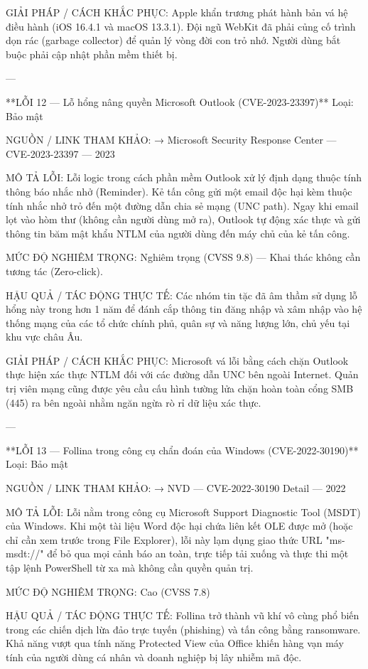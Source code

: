 GIẢI PHÁP / CÁCH KHẮC PHỤC:
Apple khẩn trương phát hành bản vá hệ điều hành (iOS 16.4.1 và macOS 13.3.1). Đội ngũ WebKit đã phải củng cố trình dọn rác (garbage collector) để quản lý vòng đời con trỏ nhớ. Người dùng bắt buộc phải cập nhật phần mềm thiết bị.

---

**LỖI 12 — Lỗ hổng nâng quyền Microsoft Outlook (CVE-2023-23397)**
Loại: Bảo mật

NGUỒN / LINK THAM KHẢO:
→ Microsoft Security Response Center — CVE-2023-23397 — 2023

MÔ TẢ LỖI:
Lỗi logic trong cách phần mềm Outlook xử lý định dạng thuộc tính thông báo nhắc nhở (Reminder). Kẻ tấn công gửi một email độc hại kèm thuộc tính nhắc nhở trỏ đến một đường dẫn chia sẻ mạng (UNC path). Ngay khi email lọt vào hòm thư (không cần người dùng mở ra), Outlook tự động xác thực và gửi thông tin băm mật khẩu NTLM của người dùng đến máy chủ của kẻ tấn công.

MỨC ĐỘ NGHIÊM TRỌNG:
Nghiêm trọng (CVSS 9.8) — Khai thác không cần tương tác (Zero-click).

HẬU QUẢ / TÁC ĐỘNG THỰC TẾ:
Các nhóm tin tặc đã âm thầm sử dụng lỗ hổng này trong hơn 1 năm để đánh cắp thông tin đăng nhập và xâm nhập vào hệ thống mạng của các tổ chức chính phủ, quân sự và năng lượng lớn, chủ yếu tại khu vực châu Âu.

GIẢI PHÁP / CÁCH KHẮC PHỤC:
Microsoft vá lỗi bằng cách chặn Outlook thực hiện xác thực NTLM đối với các đường dẫn UNC bên ngoài Internet. Quản trị viên mạng cũng được yêu cầu cấu hình tường lửa chặn hoàn toàn cổng SMB (445) ra bên ngoài nhằm ngăn ngừa rò rỉ dữ liệu xác thực.

---

**LỖI 13 — Follina trong công cụ chẩn đoán của Windows (CVE-2022-30190)**
Loại: Bảo mật

NGUỒN / LINK THAM KHẢO:
→ NVD — CVE-2022-30190 Detail — 2022

MÔ TẢ LỖI:
Lỗi nằm trong công cụ Microsoft Support Diagnostic Tool (MSDT) của Windows. Khi một tài liệu Word độc hại chứa liên kết OLE được mở (hoặc chỉ cần xem trước trong File Explorer), lỗi này lạm dụng giao thức URL "ms-msdt://" để bỏ qua mọi cảnh báo an toàn, trực tiếp tải xuống và thực thi một tập lệnh PowerShell từ xa mà không cần quyền quản trị.

MỨC ĐỘ NGHIÊM TRỌNG:
Cao (CVSS 7.8)

HẬU QUẢ / TÁC ĐỘNG THỰC TẾ:
Follina trở thành vũ khí vô cùng phổ biến trong các chiến dịch lừa đảo trực tuyến (phishing) và tấn công bằng ransomware. Khả năng vượt qua tính năng Protected View của Office khiến hàng vạn máy tính của người dùng cá nhân và doanh nghiệp bị lây nhiễm mã độc.

